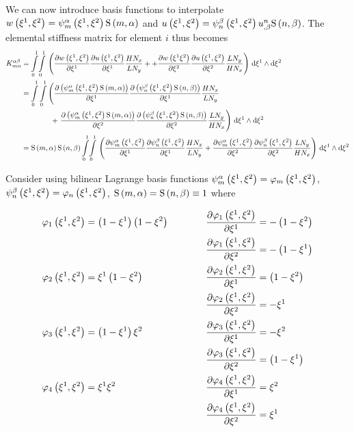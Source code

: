 We can now introduce basis functions to interpolate \ie
$\fnof{w}{\xione,\xitwo}=\gbfn{m}{\alpha}{\xione,\xitwo}\gsf{m}{\alpha}$
and
$\fnof{u}{\xione,\xitwo}=\gbfn{n}{\beta}{\xione,\xitwo}\nodedof{u}{n}{\beta}\gsf{n}{\beta}$. The
elemental stiffness matrix for element $i$ thus becomes
\begin{equation}
  \begin{aligned}
    K^{\alpha\beta}_{mn}&=\giint{0}{1}{0}{1}{\pbrac{
        \delby{\fnof{w}{\xione,\xitwo}}{\xione}\delby{\fnof{u}{\xione,\xitwo}}{\xione}\dfrac{H N_{x}}{L N_{y}}+
        +\delby{\fnof{w}{\xione\xitwo}}{\xitwo}\delby{\fnof{u}{\xione,\xitwo}}{\xitwo}\dfrac{L N_{y}}{H N_{x}}}
    }{\xione}{\xitwo} \\
    &=\dintl{0}{1}\dintl{0}{1}\left(\delby{\pbrac{\gbfn{m}{\alpha}{\xione,\xitwo}\gsf{m}{\alpha}}}{\xione}
    \delby{\pbrac{\gbfn{n}{\beta}{\xione,\xitwo}\gsf{n}{\beta}}}{\xione}\dfrac{H N_{x}}{L N_{y}}\right.\\
    &\qquad\qquad+\left.\delby{\pbrac{\gbfn{m}{\alpha}{\xione,\xitwo}\gsf{m}{\alpha}}}{\xitwo}
    \delby{\pbrac{\gbfn{n}{\beta}{\xione,\xitwo}\gsf{n}{\beta}}}{\xitwo}\dfrac{L N_{y}}{H N_{x}}\right)
    \infinitesimaltwo{\xione}{\xitwo}\\
    &=\gsf{m}{\alpha}\gsf{n}{\beta}\giint{0}{1}{0}{1}{\pbrac{\delby{\gbfn{m}{\alpha}{\xione,\xitwo}}{\xione}
        \delby{\gbfn{n}{\beta}{\xione,\xitwo}}{\xione}\dfrac{H N_{x}}{L N_{y}}+
        \delby{\gbfn{m}{\alpha}{\xione,\xitwo}}{\xitwo}\delby{\gbfn{n}{\beta}{\xione,\xitwo}}{\xitwo}
        \dfrac{L N_{y}}{H N_{x}}}}{\xione}{\xitwo}
  \end{aligned}
\end{equation}

Consider using bilinear Lagrange basis functions \ie
$\gbfn{m}{\alpha}{\xione,\xitwo}=\lbfn{m}{\xione,\xitwo}$,
$\gbfn{n}{\beta}{\xione,\xitwo}=\lbfn{n}{\xione,\xitwo}$,
$\gsf{m}{\alpha}=\gsf{n}{\beta}\equiv 1$ where

\begin{alignat*}{3}
  \lbfn{1}{\xione,\xitwo}&=\pbrac{1-\xione}\pbrac{1-\xitwo}&\quad&&\delby{\lbfn{1}{\xione,\xitwo}}{\xione}&=-\pbrac{1-\xitwo}\\
  &&&&\delby{\lbfn{1}{\xione,\xitwo}}{\xitwo}&=-\pbrac{1-\xione} \\
  \lbfn{2}{\xione,\xitwo}&=\xione\pbrac{1-\xitwo}&\qquad&&\delby{\lbfn{2}{\xione,\xitwo}}{\xione}&=\pbrac{1-\xitwo}\\
  &&&&\delby{\lbfn{2}{\xione,\xitwo}}{\xitwo}&=-\xione\\
  \lbfn{3}{\xione,\xitwo}&=\pbrac{1-\xione}\xitwo&\qquad&&\delby{\lbfn{3}{\xione,\xitwo}}{\xione}&=-\xitwo\\
  &&&&\delby{\lbfn{3}{\xione,\xitwo}}{\xitwo}&=\pbrac{1-\xione}\\
  \lbfn{4}{\xione,\xitwo}&=\xione\xitwo&\qquad&&\delby{\lbfn{4}{\xione,\xitwo}}{\xione}&=\xitwo\\
  &&&&\delby{\lbfn{4}{\xione,\xitwo}}{\xitwo}&=\xione
\end{alignat*}

